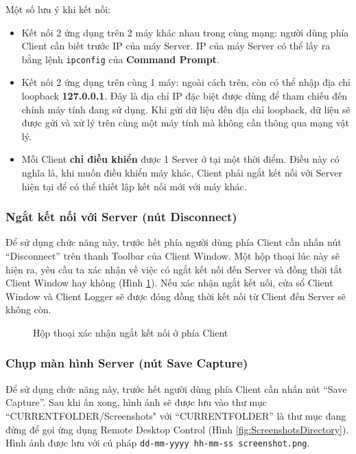 Một số lưu ý khi kết nối:
\begin{itemize}
	\item  Kết nối 2 ứng dụng trên 2 máy khác nhau trong cùng mạng: người dùng phía Client cần biết trước IP của máy Server. IP của máy Server có thể lấy ra bằng lệnh \verb|ipconfig| của \textbf{Command Prompt}.
	\item Kết nối 2 ứng dụng trên cùng 1 máy: ngoài cách trên, còn có thể nhập địa chỉ loopback \textbf{127.0.0.1}. Đây là địa chỉ IP đặc biệt được dùng để tham chiếu đến chính máy tính đang sử dụng. Khi gửi dữ liệu đến địa chỉ loopback, dữ liệu sẽ được gửi và xử lý trên cùng một máy tính mà không cần thông qua mạng vật lý.
	\item Mỗi Client \textbf{chỉ điều khiển} được 1 Server ở tại một thời điểm. Điều này có nghĩa là, khi muốn điều khiển máy khác, Client phải ngắt kết nối với Server hiện tại để có thể thiết lập kết nối mới với máy khác.
\end{itemize}

\subsubsection{Ngắt kết nối với Server (nút Disconnect)}
Để sử dụng chức năng này, trước hết phía người dùng phía Client cần nhấn nút ``Disconnect'' trên thanh Toolbar của Client Window. Một hộp thoại lúc này sẽ hiện ra, yêu cầu ta xác nhận về việc có ngắt kết nối đến Server và đồng thời tắt Client Window hay không (Hình \ref{fig:ClientDisconnectDialog}). Nếu xác nhận ngắt kết nối, cửa sổ Client Window và Client Logger sẽ được đóng đồng thời kết nối từ Client đến Server sẽ không còn.

\begin{figure}[H]
	\caption{Hộp thoại xác nhận ngắt kết nối ở phía Client}
	\label{fig:ClientDisconnectDialog}
\end{figure}

\subsubsection{Chụp màn hình Server (nút Save Capture)}
Để sử dụng chức năng này, trước hết người dùng phía Client cần nhấn nút ``Save Capture''. Sau khi ấn xong, hình ảnh sẽ được lưu vào thư mục ``CURRENTFOLDER\slash Screenshots" với ``CURRENTFOLDER'' là thư mục đang đứng để gọi ứng dụng Remote Desktop Control (Hình \ref{fig:ScreenshotsDirectory}). Hình ảnh được lưu với cú pháp \newline \noindent \verb|dd-mm-yyyy hh-mm-ss screenshot.png|.

